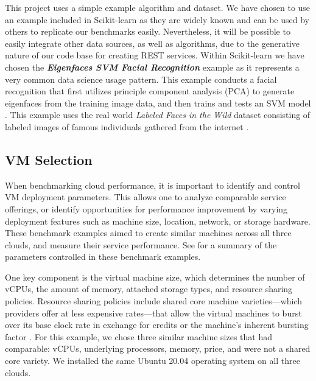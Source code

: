 This project uses a simple example algorithm and dataset. We have chosen to use an example included in Scikit-learn as they are
widely known and can be used by others to replicate our benchmarks
easily. Nevertheless, it will be possible to easily integrate other data
sources, as well as algorithms, due to the generative nature of our code base for creating REST services. Within Scikit-learn we have chosen the {\bf\em Eigenfaces SVM Facial Recognition} example as it represents a very common data science usage pattern. This example conducts a facial recognition
that first utilizes principle component analysis (PCA) to
generate eigenfaces from the training image data, and then trains and
tests an SVM model \cite{www-skikit-learn-faces}. This example uses the real world {\em Labeled Faces in the Wild} dataset
consisting of labeled images of famous individuals gathered from the
internet \cite{faces-data}.




\subsection{VM Selection}\label{vm-selection}

When benchmarking cloud performance, it is important to identify and
control VM deployment parameters. This allows one to analyze comparable service offerings, or identify
opportunities for performance improvement by varying deployment features
such as machine size, location, network, or storage hardware. These
benchmark examples aimed to create similar machines across all three clouds, and
measure their service performance. See  for a summary of the parameters
controlled in these benchmark examples.

One key component is the virtual machine size, which determines the
number of vCPUs, the amount of memory, attached storage types, and
resource sharing policies. Resource sharing policies include shared
core machine varieties—which providers offer at less expensive rates—that allow the virtual machines to burst over its base clock rate in
exchange for credits or the machine's inherent bursting factor
\cite{amazon-instances,google-instances}. For this example, we chose
three similar machine sizes that had comparable: vCPUs, underlying processors, memory, price, and were not a shared core variety. We installed the same Ubuntu 20.04 operating system on all
three clouds.

